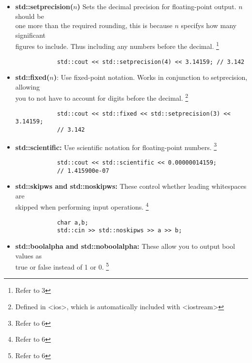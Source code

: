 \documentclass{report}
\begin{document}
\begin{itemize}
        \item \textbf{std::setprecision($n$)} Sets the decimal precision for floating-point output. $n$ should be  \\ one more than the required rounding, this is because $n$ specifys how many significant  \\ figures to include. Thus including any numbers before the decimal. \footnote{Refer to 3}
            \smallbreak
            \sepline
            \begin{verbatim}
            std::cout << std::setprecision(4) << 3.14159; // 3.142
            \end{verbatim}
            \sepline
            \pagebreak \bigbreak \noindent 
        \item \textbf{std::fixed($n$)}: Use fixed-point notation. Works in conjunction to setprecision, allowing \\ you to not have to account for digits before the decimal.  \footnote{Defined in <ios>, which is automatically included with <iostream>}
            \smallbreak
            \sepline
            \begin{verbatim}
            std::cout << std::fixed << std::setprecision(3) << 3.14159; 
            // 3.142
            \end{verbatim}
            \sepline
        \item \textbf{std::scientific:} Use scientific notation for floating-point numbers. \footnote{Refer to 6}
            \smallbreak
            \sepline
            \begin{verbatim}
            std::cout << std::scientific << 0.00000014159; 
            // 1.415900e-07 
            \end{verbatim}
            \sepline
        \item \textbf{std::skipws and std::noskipws:} These control whether leading whitespaces are \\ skipped when performing input operations. \footnote{Refer to 6}
            \smallbreak
            \sepline
            \begin{verbatim}
            char a,b;
            std::cin >> std::noskipws >> a >> b;
            \end{verbatim}
            \sepline
        \item \textbf{std::boolalpha and std::noboolalpha:} These allow you to output bool values as \\ true or false instead of 1 or 0. \footnote{Refer to 6}

\end{itemize}
\end{document}
